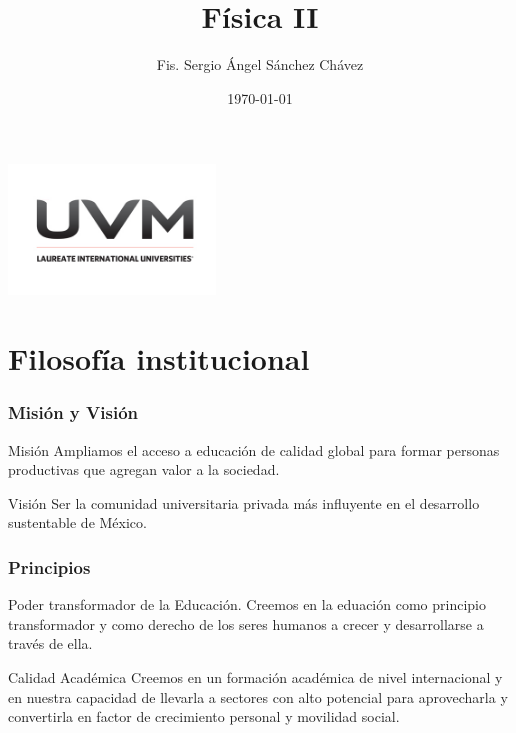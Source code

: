 \documentclass[handout]{beamer}
\title{Física II}
\author{Fis. Sergio Ángel Sánchez Chávez}
\institute[UVM]{4\textdegree \hspace{2pt} cuatrimestre.}
\date{\today}
\begin{document}
\begin{frame}[noframenumbering]
  \titlepage
  \begin{center}
    \includegraphics[width=5.5cm]{uvm1}    
  \end{center}  
\end{frame}


\section{Filosofía institucional}

\begin{frame}
  \frametitle{Misión y Visión}
  \begin{center}
    \begin{block}{Misión}
      {\large Ampliamos el acceso a educación de calidad global para formar personas
        productivas que agregan valor a la sociedad.}
    \end{block}
    \begin{block}{Visión}
      {\large Ser la comunidad universitaria privada más influyente en el desarrollo
        sustentable de México.}
    \end{block}
  \end{center}
\end{frame}



\begin{frame}
  \frametitle{Principios}
  \begin{block}{Poder transformador de la Educación.}
  Creemos en la eduación como principio transformador y como derecho de los seres humanos
  a crecer y desarrollarse a través de ella.  
  \end{block}

  \begin{block}{Calidad Académica}
    Creemos en un formación académica de nivel internacional y en nuestra capacidad de
    llevarla a sectores con alto potencial para aprovecharla y convertirla en factor de
    crecimiento personal y movilidad social.
  \end{block}
\end{frame}
\end{document}
